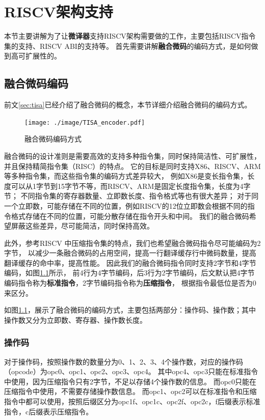 \chapter{RISCV架构支持}\label{chap:RISCV}

本节主要讲解为了让\textbf{微译器}支持RISCV架构需要做的工作，主要包括RISCV指令集的支持、RISCV ABI的支持等。
首先需要讲解\textbf{融合微码}的编码方式，是如何做到高可扩展性的。

\section{融合微码编码}

前文\ref{sec:tisa}已经介绍了融合微码的概念，本节详细介绍融合微码的编码方式。

\begin{figure}[!htbp]
  \centering
  \texttt{[image: ./image/TISA\_encoder.pdf]}
  \caption{融合微码编码方式}
  \label{img:TISA_encoder}
\end{figure}

融合微码的设计准则是需要高效的支持多种指令集，同时保持简洁性、可扩展性，并且保持精简指令集（RISC）的特点。
它的目标是同时支持X86、RISCV、ARM等多种指令集，而这些指令集的编码方式差异较大，
例如X86是变长指令集，长度可以从1字节到15字节不等，而RISCV、ARM是固定长度指令集，长度为4字节；
不同指令集的寄存器数量、立即数长度、指令格式等也有很大差异；
对于同一个立即数，可能存储在不同的位置，例如RISCV的12位立即数会根据不同的指令格式存储在不同的位置，可能分散存储在指令开头和中间。
我们的融合微码希望屏蔽这些差异，尽可能简洁，同时保持高效。

此外，参考RISCV 中压缩指令集的特点，我们也希望融合微码指令尽可能编码为2字节，
以减少一条融合微码的占用空间，提高一行翻译缓存行中微码数量，提高翻译缓存的命中率，提高性能。
因此我们的融合微码指令同时支持2字节和4字节编码，如图\ref{img:TISA_encoder}所示，
前4行为4字节编码，后3行为2字节编码，后文默认把4字节编码指令称为\textbf{标准指令}，2字节编码指令称为\textbf{压缩指令}，
根据指令最低位是否为0来区分。

如图\ref{img:TISA_encoder}，展示了融合微码的编码方式，主要包括两部分：操作码、操作数；其中操作数又分为立即数、寄存器、操作数长度。



\subsection{操作码}
对于操作码，按照操作数的数量分为0、1、2、3、4个操作数，对应的操作码（opcode）为opc0、opc1、opc2、opc3、opc4。
其中opc4、opc3只能在标准指令中使用，因为压缩指令只有2字节，不足以存储4个操作数的信息。
而opc0只能在压缩指令中使用，不需要存储操作数信息。
而opc1、opc2可以在标准指令和压缩指令中都可以使用，按照后缀区分为opc1f、opc1c、opc2f、opc2c，f后缀表示标准指令，c后缀表示压缩指令。

